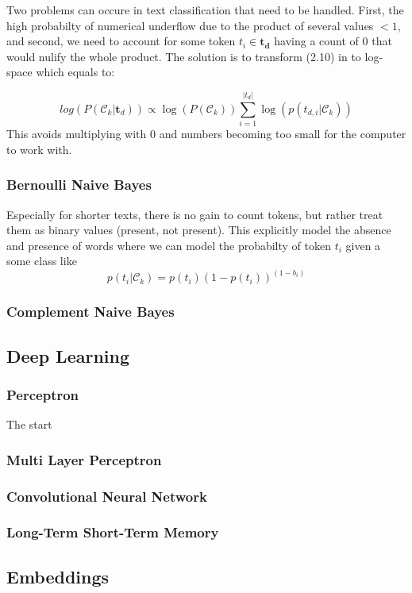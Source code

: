 Two problems can occure in text classification that need to be handled. First, the high probabilty of numerical underflow due to the product of several values $<1$, and second, we need to account for some token $t_i \in \boldsymbol{t_d}$ having a count of $0$ that would nulify the whole product. The solution is to transform (2.10) in to log-space which equals to:

$$log(P(\mathcal{C}_k|\boldsymbol{t}_d)) \propto \log(P(\mathcal{C}_k)) \sum_{i=1}^{|t_{d}|} \log({p(t_{d,i}|\mathcal{C}_k)})$$
This avoids multiplying with $0$ and numbers becoming too small for the computer to work with.

\subsubsection{Bernoulli Naive Bayes}
Especially for shorter texts, there is no gain to count tokens, but rather treat them as binary values (present, not present). This explicitly model the absence and presence of words where we can model the probabilty of token $t_i$ given a some class like
\[p(t_{i}|\mathcal{C}_k) = p(t_{i})(1-p(t_{i}))^{(1-b_{i})}\]

\subsubsection{Complement Naive Bayes}


\subsection{Deep Learning}
\subsubsection{Perceptron}
The start
\subsubsection{Multi Layer Perceptron}

\subsubsection{Convolutional Neural Network}
\subsubsection{Long-Term Short-Term Memory}


\subsection{Embeddings}
